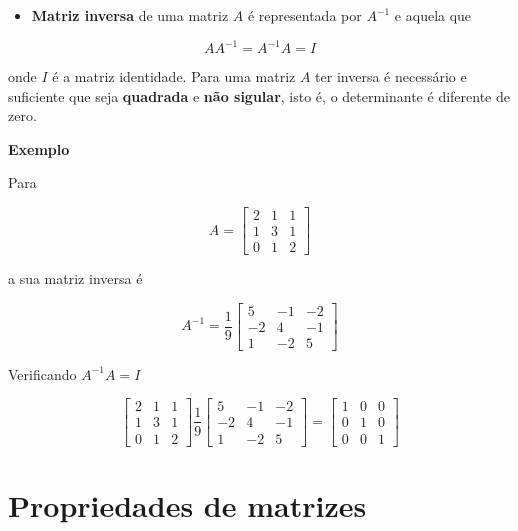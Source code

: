 \documentclass[
]{book}
\providecommand{\tightlist}{%
  \setlength{\itemsep}{0pt}\setlength{\parskip}{0pt}}
\begin{document}
\begin{itemize}
\tightlist
\item
  \textbf{Matriz inversa} de uma matriz \(A\) é representada por \(A^{-1}\) e aquela que
\end{itemize}

\begin{equation*}
AA^{-1}=A^{-1}A = I
\end{equation*}

onde \(I\) é a matriz identidade. Para uma matriz \(A\) ter inversa é necessário e suficiente que seja \textbf{quadrada} e \textbf{não sigular}, isto é, o determinante é diferente de zero.

\textbf{Exemplo}

Para

\begin{equation*}
A = 
\begin{bmatrix}
2 & 1 & 1\\
1 & 3 & 1\\
0 & 1 & 2
\end{bmatrix}
\end{equation*}

a sua matriz inversa é

\begin{equation*}
A^{-1} = \dfrac{1}{9}
\begin{bmatrix}
 5 & -1 & -2\\
-2 &  4 & -1\\
 1 & -2 &  5
\end{bmatrix}
\end{equation*}

Verificando \(A^{-1}A=I\)

\begin{equation*}
\begin{bmatrix}
2 & 1 & 1\\
1 & 3 & 1\\
0 & 1 & 2
\end{bmatrix}
\dfrac{1}{9}
\begin{bmatrix}
 5 & -1 & -2\\
-2 &  4 & -1\\
 1 & -2 &  5
\end{bmatrix}=
\begin{bmatrix}
1 & 0 & 0\\
0 & 1 & 0\\
0 & 0 & 1
\end{bmatrix}
\end{equation*}

\hypertarget{propriedades-de-matrizes}{%
\section{Propriedades de matrizes}\label{propriedades-de-matrizes}}
\end{document}
